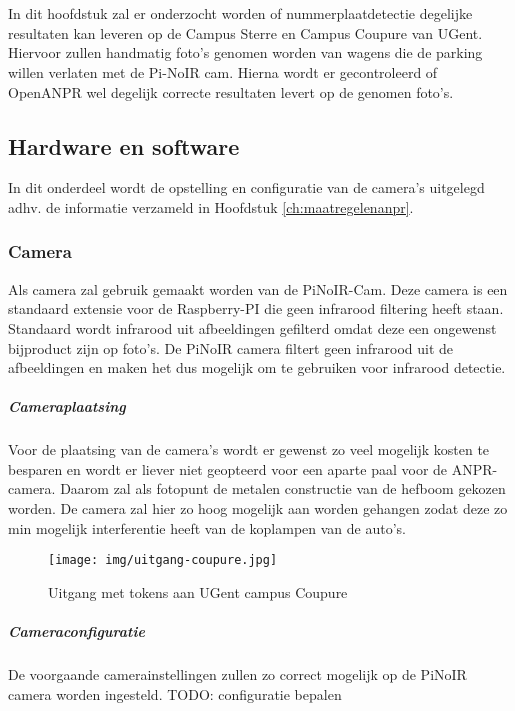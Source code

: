 
\chapter{}
\label{ch:praktischeUitvoering}
In dit hoofdstuk zal er onderzocht worden of nummerplaatdetectie degelijke resultaten kan leveren op de Campus Sterre en Campus Coupure van UGent. Hiervoor zullen handmatig foto's genomen worden van wagens die de parking willen verlaten met de Pi-NoIR cam. Hierna wordt er gecontroleerd of OpenANPR wel degelijk correcte resultaten levert op de genomen foto's.


\section{Hardware en software}
In dit onderdeel wordt de opstelling en configuratie van de camera's uitgelegd adhv. de informatie verzameld in Hoofdstuk \ref{ch:maatregelenanpr}.

\subsection{Camera}
Als camera zal gebruik gemaakt worden van de PiNoIR-Cam. Deze camera is een standaard extensie voor de Raspberry-PI die geen infrarood filtering heeft staan. Standaard wordt infrarood uit afbeeldingen gefilterd omdat deze een ongewenst bijproduct zijn op foto's. De PiNoIR camera filtert geen infrarood uit de afbeeldingen en maken het dus mogelijk om te gebruiken voor infrarood detectie.

\paragraph{Cameraplaatsing}
Voor de plaatsing van de camera's wordt er gewenst zo veel mogelijk kosten te besparen en wordt er liever niet geopteerd voor een aparte paal voor de ANPR-camera. Daarom zal als fotopunt de metalen constructie van de hefboom gekozen worden. De camera zal hier zo hoog mogelijk aan worden gehangen zodat deze zo min mogelijk interferentie heeft van de koplampen van de auto's.

\begin{figure}[h!]
	\centering
	\texttt{[image: img/uitgang-coupure.jpg]}
	\caption{Uitgang met tokens aan UGent campus Coupure}
\end{figure}

\paragraph{Cameraconfiguratie}
De voorgaande camerainstellingen zullen zo correct mogelijk op de PiNoIR camera worden ingesteld.
TODO: configuratie bepalen

